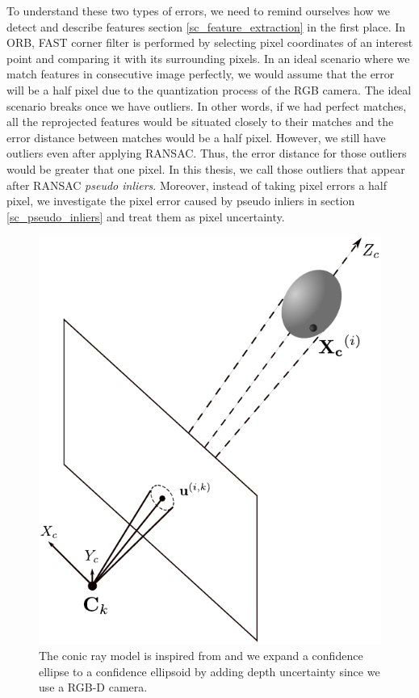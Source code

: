 \documentclass[a4paper]{report}
\numberwithin{figure}{section}
\begin{document}
To understand these two types of errors, we need to remind ourselves how we
detect and describe features section \ref{sc_feature_extraction} in the first
place.  In ORB, FAST corner filter is performed by selecting pixel coordinates
of an interest point and comparing it with its surrounding pixels. In an ideal
scenario where we match features in consecutive image perfectly, we would
assume that the error will be a half pixel due to the quantization process of
the RGB camera.  The ideal scenario breaks once we have outliers. 
In other words, if we had perfect matches, all the reprojected features would
be situated closely to their matches and the error distance between matches
would be a half pixel. However, we still have outliers even after applying
RANSAC. Thus, the error distance for those outliers would be greater that one
pixel.  In this thesis, we call those outliers that appear after RANSAC
\textit{pseudo inliers}. Moreover, instead of taking pixel errors a half pixel,
we investigate the pixel error caused by pseudo inliers in section
\ref{sc_pseudo_inliers} and treat them as pixel uncertainty.

\begin{figure}[H] \centering
\includegraphics[width=0.6\linewidth,natwidth=640,natheight=640]
{fig/drawings/conic_ray.pdf} \caption[The Conic Ray Error Model]{ The conic ray
model is inspired from \parencite{Sola2007a} and we expand a confidence 
ellipse 
to a
confidence ellipsoid by adding depth uncertainty since we use a RGB-D camera.}
\label{fig:conic_ray_3d_error_model} \end{figure}
\end{document}
